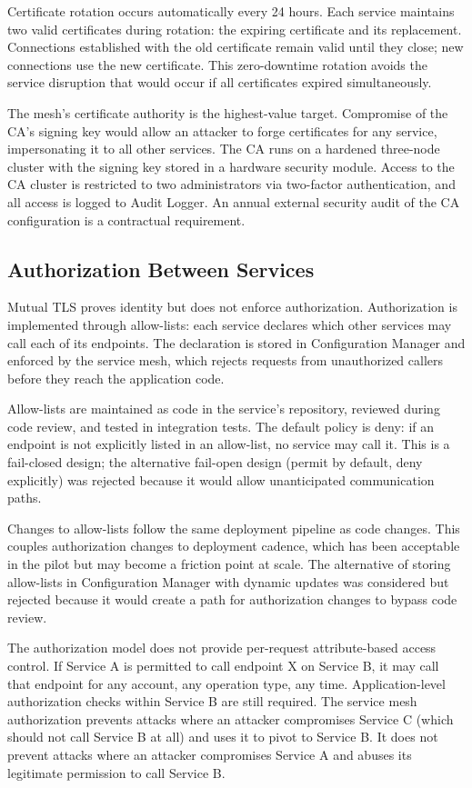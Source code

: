 Certificate rotation occurs automatically every 24 hours. Each service maintains two valid certificates during rotation: the expiring certificate and its replacement. Connections established with the old certificate remain valid until they close; new connections use the new certificate. This zero-downtime rotation avoids the service disruption that would occur if all certificates expired simultaneously.

The mesh's certificate authority is the highest-value target. Compromise of the CA's signing key would allow an attacker to forge certificates for any service, impersonating it to all other services. The CA runs on a hardened three-node cluster with the signing key stored in a hardware security module. Access to the CA cluster is restricted to two administrators via two-factor authentication, and all access is logged to Audit Logger. An annual external security audit of the CA configuration is a contractual requirement.

\subsection{Authorization Between Services}

Mutual TLS proves identity but does not enforce authorization. Authorization is implemented through allow-lists: each service declares which other services may call each of its endpoints. The declaration is stored in Configuration Manager and enforced by the service mesh, which rejects requests from unauthorized callers before they reach the application code.

Allow-lists are maintained as code in the service's repository, reviewed during code review, and tested in integration tests. The default policy is deny: if an endpoint is not explicitly listed in an allow-list, no service may call it. This is a fail-closed design; the alternative fail-open design (permit by default, deny explicitly) was rejected because it would allow unanticipated communication paths.

Changes to allow-lists follow the same deployment pipeline as code changes. This couples authorization changes to deployment cadence, which has been acceptable in the pilot but may become a friction point at scale. The alternative of storing allow-lists in Configuration Manager with dynamic updates was considered but rejected because it would create a path for authorization changes to bypass code review.

The authorization model does not provide per-request attribute-based access control. If Service A is permitted to call endpoint X on Service B, it may call that endpoint for any account, any operation type, any time. Application-level authorization checks within Service B are still required. The service mesh authorization prevents attacks where an attacker compromises Service C (which should not call Service B at all) and uses it to pivot to Service B. It does not prevent attacks where an attacker compromises Service A and abuses its legitimate permission to call Service B.


